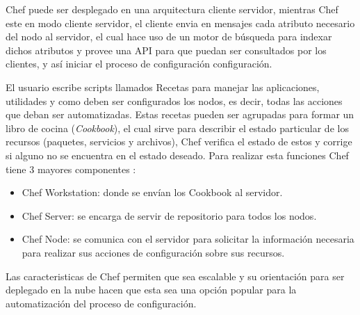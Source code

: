 \par Chef puede ser desplegado en una arquitectura cliente servidor, mientras Chef este en modo cliente servidor, el cliente envia en mensajes cada atributo necesario del nodo al servidor, el cual hace uso de un motor de búsqueda para indexar dichos atributos y provee una API para que puedan ser consultados por los clientes, y así iniciar el proceso de configuración configuración.\\

\par El usuario escribe scripts llamados Recetas para manejar las aplicaciones, utilidades y como deben ser configurados los nodos, es decir, todas las acciones que deban ser automatizadas. Estas recetas pueden ser agrupadas para formar un libro de cocina (\textit{Cookbook}), el cual sirve  para describir el estado particular de los recursos (paquetes, servicios y archivos), Chef verifica el estado de estos y corrige si alguno no se encuentra en el estado deseado. Para realizar esta funciones Chef tiene 3 mayores componentes \cite{BOOK16}:
\begin{itemize}
    \item Chef Workstation: donde se envían los Cookbook al servidor.
    \item Chef Server: se encarga de servir de repositorio para todos los nodos.
    \item Chef Node: se comunica con el servidor para solicitar la información necesaria para realizar sus acciones de configuración sobre sus recursos.
\end{itemize}

\par Las caracteristicas de Chef permiten que sea escalable y su orientación para ser deplegado en la nube hacen que esta sea una opción popular para la automatización del proceso de configuración.

